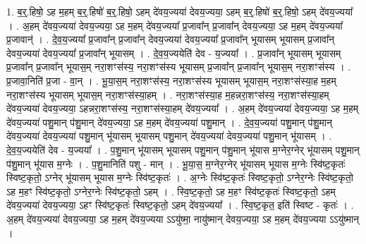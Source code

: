 \documentclass[17pt]{extarticle}
\begin{document}
1. ब॒र्॒.हिषो॒ ऽह म॒हम् ब॒र्॒.हिषो॑ ब॒र्॒.हिषो॒ ऽहम् दे॑वय॒ज्यया॑ देवय॒ज्यया॒ ऽहम् ब॒र्॒.हिषो॑ ब॒र्॒.हिषो॒ ऽहम् दे॑वय॒ज्यया᳚ । . अ॒हम् दे॑वय॒ज्यया॑ देवय॒ज्यया॒ ऽह म॒हम् दे॑वय॒ज्यया᳚ प्र॒जावा᳚न् प्र॒जावा᳚न् देवय॒ज्यया॒ ऽह म॒हम् दे॑वय॒ज्यया᳚ प्र॒जावान्॑ । . दे॒व॒य॒ज्यया᳚ प्र॒जावा᳚न् प्र॒जावा᳚न् देवय॒ज्यया॑ देवय॒ज्यया᳚ प्र॒जावा᳚न् भूयासम् भूयासम् प्र॒जावा᳚न् देवय॒ज्यया॑ देवय॒ज्यया᳚ प्र॒जावा᳚न् भूयासम् । . दे॒व॒य॒ज्ययेति॑ देव - य॒ज्यया᳚ । . प्र॒जावा᳚न् भूयासम् भूयासम् प्र॒जावा᳚न् प्र॒जावा᳚न् भूयास॒म् नरा॒शꣳस॑स्य॒ नरा॒शꣳस॑स्य भूयासम् प्र॒जावा᳚न् प्र॒जावा᳚न् भूयास॒म् नरा॒शꣳस॑स्य । . प्र॒जावा॒निति॑ प्र॒जा - वा॒न् । . भू॒या॒स॒म् नरा॒शꣳस॑स्य॒ नरा॒शꣳस॑स्य भूयासम् भूयास॒म् नरा॒शꣳस॑स्या॒ह म॒हम् नरा॒शꣳस॑स्य भूयासम् भूयास॒म् नरा॒शꣳस॑स्या॒हम् । . नरा॒शꣳस॑स्या॒ह म॒हन्नरा॒शꣳस॑स्य॒ नरा॒शꣳस॑स्या॒हम् दे॑वय॒ज्यया॑ देवय॒ज्यया॒ ऽहन्नरा॒शꣳस॑स्य॒ नरा॒शꣳस॑स्या॒हम् दे॑वय॒ज्यया᳚ । . अ॒हम् दे॑वय॒ज्यया॑ देवय॒ज्यया॒ ऽह म॒हम् दे॑वय॒ज्यया॑ पशु॒मान् प॑शु॒मान् दे॑वय॒ज्यया॒ ऽह म॒हम् दे॑वय॒ज्यया॑ पशु॒मान् । . दे॒व॒य॒ज्यया॑ पशु॒मान् प॑शु॒मान् दे॑वय॒ज्यया॑ देवय॒ज्यया॑ पशु॒मान् भू॑यासम् भूयासम् पशु॒मान् दे॑वय॒ज्यया॑ देवय॒ज्यया॑ पशु॒मान् भू॑यासम् । . दे॒व॒य॒ज्ययेति॑ देव - य॒ज्यया᳚ । . प॒शु॒मान् भू॑यासम् भूयासम् पशु॒मान् प॑शु॒मान् भू॑यास म॒ग्नेर॒ग्नेर् भू॑यासम् पशु॒मान् प॑शु॒मान् भू॑यास म॒ग्नेः । . प॒शु॒मानिति॑ पशु - मान् । . भू॒या॒स॒ म॒ग्नेर॒ग्नेर् भू॑यासम् भूयास म॒ग्नेः स्वि॑ष्ट॒कृतः॑ स्विष्ट॒कृतो॒ ऽग्नेर् भू॑यासम् भूयास म॒ग्नेः स्वि॑ष्ट॒कृतः॑ । . अ॒ग्नेः स्वि॑ष्ट॒कृतः॑ स्विष्ट॒कृतो॒ ऽग्नेर॒ग्नेः स्वि॑ष्ट॒कृतो॒ ऽह म॒हꣳ स्वि॑ष्ट॒कृतो॒ ऽग्नेर॒ग्नेः स्वि॑ष्ट॒कृतो॒ ऽहम् । . स्वि॒ष्ट॒कृतो॒ ऽह म॒हꣳ स्वि॑ष्ट॒कृतः॑ स्विष्ट॒कृतो॒ ऽहम् दे॑वय॒ज्यया॑ देवय॒ज्यया॒ ऽहꣳ स्वि॑ष्ट॒कृतः॑ स्विष्ट॒कृतो॒ ऽहम् दे॑वय॒ज्यया᳚ । . स्वि॒ष्ट॒कृत॒ इति॑ स्विष्ट - कृतः॑ । . अ॒हम् दे॑वय॒ज्यया॑ देवय॒ज्यया॒ ऽह म॒हम् दे॑वय॒ज्यया ऽऽयु॑ष्मा॒ नायु॑ष्मान् देवय॒ज्यया॒ ऽह म॒हम् दे॑वय॒ज्यया ऽऽयु॑ष्मान् । \newline
\end{document}
